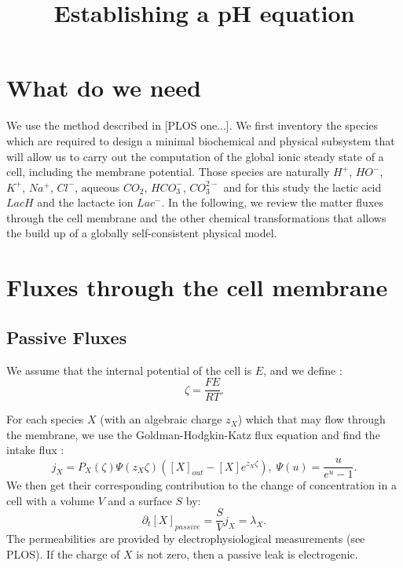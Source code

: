 \documentclass{revtex4}
\begin{document}
\title{Establishing a pH equation}
\maketitle

\section{What do we need}
We use the method described in [PLOS one...]. We first inventory the species which are required
to design a minimal biochemical and physical subsystem that will allow us to carry out the computation
of the global ionic steady state of a cell, including the membrane potential.
Those species are naturally $H^+$, $HO^-$, $K^+$, $Na^+$, $Cl^-$, aqueous $CO_2$, $HCO_3^-$, $CO_3^{2-}$ and
for this study the lactic acid $LacH$ and the lactacte ion $Lac^-$.
In the following, we review the  matter fluxes through the cell membrane and the other
chemical transformations that allows the build up of a globally self-consistent physical model.

\section{Fluxes through the cell membrane}


\subsection{Passive Fluxes}
We assume that the internal potential of the cell is $E$, and we define :
\begin{equation}
	\zeta = \dfrac{FE}{RT}.
\end{equation}

For each species $X$ (with an algebraic charge $z_X$) which that may flow through the membrane, we use the Goldman-Hodgkin-Katz flux equation and find the intake flux :
\begin{equation}
	j_X =  P_X\left(\zeta\right) \Psi(z_X\zeta)
	\left([X]_{out} - [X]e^{z_X\zeta}\right), \; \Psi(u) = \dfrac{u}{e^u-1}.
\end{equation}
We then get their corresponding contribution to the change of concentration in a cell with a volume $V$ and
a surface $S$ by:
\begin{equation}
	\partial_t [X]_{passive} = \dfrac{S}{V} j_X = \lambda_X.
\end{equation}
The permeabilities are provided by electrophysiological measurements (see PLOS).
If the charge of $X$ is not zero, then a passive leak is electrogenic.
\end{document}
